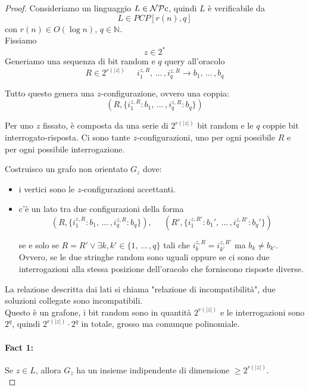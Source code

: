 \begin{proof}
	Consideriamo un linguaggio $L \in \mathcal{NP} c$, quindi $L$ è verificabile da 
	$$ L \in PCP [r(n), q] $$
	con $r(n) \in O(\log n)$, $q \in \mathbb{N}$.\\
	
	Fissiamo 
	$$ z \in 2^\ast $$
	Generiamo una sequenza di bit random e $q$ query all'oracolo
	$$ R \in 2^{r(|z|)} \;\;\;\;\; i_1^{z,R}, \, \dots \, , i_q^{z,R} \rightarrow b_1, \, \dots \, , b_q $$
	
	Tutto questo genera una $z$-configurazione, ovvero una coppia: 
	$$ (R, \{i_1^{z,R}: b_1, \, \dots \, , i_q^{z,R}: b_q\}) 	$$
	
	Per uno $z$ fissato, è composta da una serie di $2^{r(|z|)}$ bit random e le $q$ coppie bit interrogato-risposta. Ci sono tante $z$-configurazioni, uno per ogni possibile $R$ e per ogni possibile interrogazione.\\
	
	\newpage
	
	Costruisco un grafo non orientato $G_z$ dove: 
	\begin{itemize}
		\item i vertici sono le $z$-configurazioni accettanti.\\
		
		\item c'è un lato tra due configurazioni della forma
		$$ 
		(R, \{i_1^{z,R}: b_1, \, \dots \, , i_q^{z,R}: b_q\}), \;\;\;\;\; (R', \{i_1^{z,R'}: b_1', \, \dots \, , i_q^{z,R'}: b_q'\}) 
		$$
		
		se e solo se $R = R' \vee \exists k, k' \in \{1, \, \dots \, , q\}$ tali che $i_k^{z,R} = i_{k'}^{z,R'}$ ma $b_k \neq b_{k'}$. Ovvero, se le due stringhe random sono uguali oppure se ci sono due interrogazioni alla stessa posizione dell'oracolo che forniscono risposte diverse. \\
	\end{itemize}

	La relazione descritta dai lati si chiama "relazione di incompatibilità", due soluzioni collegate sono incompatibili.\\
	
	Questo è un grafone, i bit random sono in quantità $2^{r(|z|)}$ e le interrogazioni sono $2^q$, quindi $2^{r(|z|)} \cdot 2^q$ in totale, grosso ma comunque polinomiale.\\
	
	\paragraph{Fact 1:} Se $z \in L$, allora $G_z$ ha un insieme indipendente di dimensione $\geq 2^{r(|z|)}$.\\
	

\end{proof}
